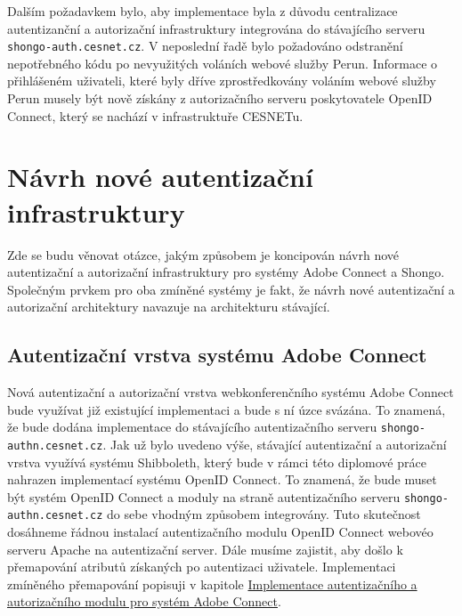 \documentclass[
  printed, %
  twoside, %
  table,   %
  nolof,     %
  nolot,     %
]{fithesis3}
\begin{document}
Dalším požadavkem bylo, aby implementace byla z důvodu centralizace autentizanční a autorizační infrastruktury integrována do stávajícího serveru \texttt{shongo-auth.cesnet.cz}. V neposlední řadě bylo požadováno odstranění nepotřebného kódu po nevyužitých voláních webové služby Perun. Informace o přihlášeném uživateli, které byly dříve zprostředkovány voláním webové služby Perun musely být nově získány z autorizačního serveru poskytovatele OpenID Connect, který se nachází v infrastruktuře CESNETu.     


\section{Návrh nové autentizační infrastruktury}
Zde se budu věnovat otázce, jakým způsobem je koncipován návrh nové autentizační a autorizační infrastruktury pro systémy Adobe Connect a Shongo. Společným prvkem pro oba zmíněné systémy je fakt, že návrh nové autentizační a autorizační architektury navazuje na architekturu stávající. 

\subsection{Autentizační vrstva systému Adobe Connect}
Nová autentizační a autorizační vrstva webkonferenčního systému Adobe Connect bude využívat již existující implementaci a bude s ní úzce svázána. To znamená, že bude dodána implementace do stávajícího autentizačního serveru \texttt{shongo-authn.cesnet.cz}. Jak už bylo uvedeno výše, stávající autentizační a autorizační vrstva využívá systému Shibboleth, který bude v rámci této diplomové práce nahrazen implementací systému OpenID Connect. To znamená, že bude muset být systém OpenID Connect a moduly na straně autentizačního serveru \texttt{shongo-authn.cesnet.cz} do sebe vhodným způsobem integrovány. Tuto skutečnost dosáhneme řádnou instalací autentizačního modulu OpenID Connect webovéo serveru Apache na autentizační server. Dále musíme zajistit, aby došlo k přemapování atributů získaných po autentizaci uživatele. Implementaci zmíněného přemapování popisuji v kapitole \hyperref[ACImpl]{Implementace autentizačního a autorizačního modulu pro systém Adobe Connect}. 
\end{document}
